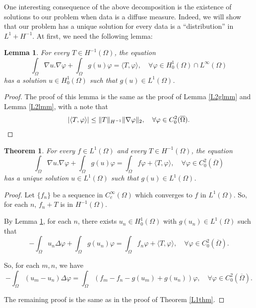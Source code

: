 \documentclass[a4paper, 11pt]{report}
\newtheorem{thm}{Theorem}[chapter]
\newtheorem{lmm}{Lemma}[chapter]
\theoremstyle{definition}\newtheorem*{rmk}{Remark}
\begin{document}
One interesting consequence of the above decomposition is the existence of solutions to our problem when data is a diffuse measure. Indeed, we will show that our problem has a unique solution for every data is a ``distribution'' in $L^1 + H^{-1}$. At first, we need the following lemma:

\begin{lmm}\label{33lmm}
For every $T\in H^{-1}(\Omega)$, the equation
\[
\int_{\Omega}\nabla u.\nabla \varphi + \int_{\Omega} g(u)\varphi = \langle T , \varphi \rangle, \quad \forall \varphi \in H^1_0(\Omega) \cap L^{\infty}(\Omega)
\]
has a solution $u\in H^{1}_0(\Omega)$ such that $g(u)\in L^1(\Omega)$.
\end{lmm}

\begin{proof}
The proof of this lemma is the same as the proof of Lemma \ref{L2glmm} and Lemma \ref{L2lmm}, with a note that
\[
|\langle T,\varphi \rangle| \leq \| T \|_{H^{-1}}\|\nabla\varphi\|_2,\quad\forall \varphi \in C^2_0(\overline{\Omega}).\qedhere
\]
\end{proof}

\begin{thm}
For every $f \in L^1(\Omega)$ and every $T\in H^{-1}(\Omega)$, the equation
\[
\int_{\Omega}\nabla u.\nabla \varphi + \int_{\Omega} g(u)\varphi = \int_{\Omega} f\varphi + \langle T , \varphi \rangle ,\quad \forall \varphi \in C^2_0(\overline{\Omega})
\]
has a unique solution $u\in L^1(\Omega)$ such that $g(u)\in L^1(\Omega)$.
\end{thm}

\begin{proof}
\mbox{}

Let $\{f_n\}$ be a sequence in $C^{\infty}_c(\Omega)$ which converges to $f$ in $L^1(\Omega)$. So, for each $n$, $f_n + T$ is in $H^{-1}(\Omega)$.

By Lemma \ref{33lmm}, for each $n$, there exists $u_n\in H^1_0(\Omega)$ with $g(u_n)\in L^1(\Omega)$ such that
\[
-\int_{\Omega} u_n\Delta \varphi +\int_{\Omega} g(u_n)\varphi = \int_{\Omega} f_n \varphi + \langle T , \varphi \rangle, \quad\forall \varphi\in C^2_0(\overline{\Omega}).
\]

So, for each $m,n$, we have
\[
-\int_{\Omega} (u_m-u_n)\Delta \varphi = \int_{\Omega} (f_m-f_n-g(u_m)+g(u_n)) \varphi, \quad\forall \varphi\in C^2_0(\overline{\Omega}).
\]

The remaining proof is the same as in the proof of Theorem \ref{L1thm}.
\end{proof}
\end{document}
